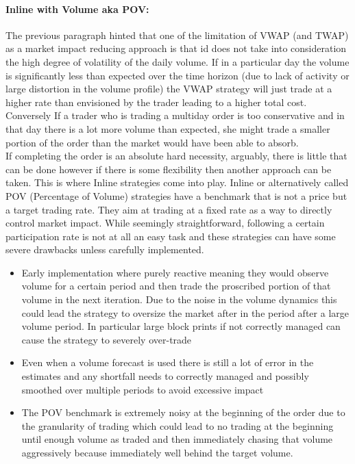
\paragraph{Inline with Volume aka POV:} 

The previous paragraph hinted that one of the limitation of VWAP (and TWAP) as a market impact reducing approach is that id does not take into consideration the high degree of volatility of the daily volume. If in a particular day the volume is significantly less than expected over the time horizon (due to lack of activity or large distortion in the volume profile) the VWAP strategy will just trade at a higher rate than envisioned by the trader leading to a higher total cost. Conversely If a trader who is trading a multiday order is too conservative and in that day there is a lot more volume than expected, she might trade a smaller portion of the order than the market would have been able to absorb. \\

If completing the order is an absolute hard necessity, arguably, there is little that can be done however if there is some flexibility then another approach can be taken. This is where Inline strategies come into play. Inline or alternatively called POV (Percentage of Volume) strategies have a benchmark that is not a price but a target trading rate. They aim at trading at a fixed rate as a way to directly control market impact. 
While seemingly straightforward, following a certain participation rate is not at all an easy task and these strategies can have some severe drawbacks unless carefully implemented.
\begin{itemize}
\item Early implementation where purely reactive meaning they would observe volume for a certain period and then trade the proscribed portion of that volume in the next iteration. Due to the noise in the volume dynamics this could lead the strategy to oversize the market after in the period after a large volume period. In particular large block prints if not correctly managed can cause the strategy to severely over-trade
\item Even when a volume forecast is used there is still a lot of error in the estimates and any shortfall needs to correctly managed and possibly smoothed over multiple periods to avoid excessive impact
\item The POV benchmark is extremely noisy at the beginning of the order due to the granularity of trading which could lead to no trading at the beginning until enough volume as traded and then immediately chasing that volume aggressively because immediately well behind the target volume.
\end{itemize}

